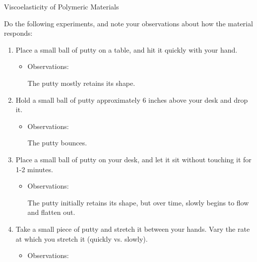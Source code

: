 \begin{activity}{Viscoelasticity of Polymeric Materials}
\begin{model}
	Do the following experiments, and note your observations about how the material responds:
	
	\begin{enumerate}
		\item Place a small ball of putty on a table, and hit it quickly with your hand.
			\begin{itemize}
				\item Observations:
				
				\begin{solution}[1in]
				
					The putty mostly retains its shape.
					
				\end{solution}
			\end{itemize}
			
		\item Hold a small ball of putty approximately 6 inches above your desk and drop it.
			\begin{itemize}
				\item Observations:
				
				\begin{solution}[1in]
				
					The putty bounces.
					
				\end{solution}
			\end{itemize}
		
		\item Place a small ball of putty on your desk, and let it sit without touching it for 1-2 minutes.
			\begin{itemize}
				\item Observations:
				
				\begin{solution}[1in]
				
					The putty initially retains its shape, but over time, slowly begins to flow and flatten out.
					
				\end{solution}
			\end{itemize}
		
		\item Take a small piece of putty and stretch it between your hands.  Vary the rate at which you stretch it (quickly vs. slowly).
			\begin{itemize}
				\item Observations:
				
				\begin{solution}[1.25in]
				

\end{solution}
\end{itemize}
\end{enumerate}
\end{model}
\end{activity}
